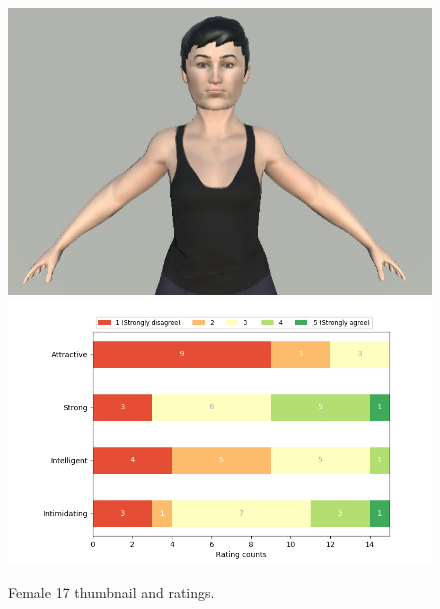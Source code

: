 \begin{figure}[H]
  \includegraphics[width=\linewidth]{Images/Females/17.JPG}
\endminipage\hfill
{}
  \includegraphics[width=\linewidth]{Survey/FRatings/avatar_f17.png}
\endminipage\hfill
\caption{Female 17 thumbnail and ratings.}
\end{figure}

